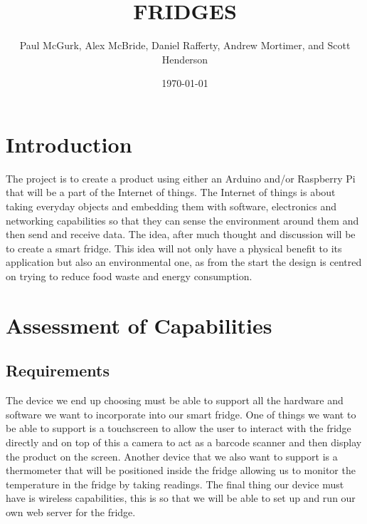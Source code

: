 \documentclass[10pt]{article}
\title{FRIDGES}
\author{Paul McGurk, Alex McBride, Daniel Rafferty, Andrew Mortimer, and Scott Henderson}
\date{\today}
\begin{document}
\begin{titlepage}
\maketitle
\end{titlepage}

\linespread{1.15} %
\renewcommand{\arraystretch}{1.2} %

\tableofcontents

\newpage
\section{Introduction}

The project is to create a product using either an Arduino and/or Raspberry Pi that will be a part of the Internet of things. The Internet of things is about taking everyday objects and embedding them with software, electronics and networking capabilities so that they can sense the environment around them and then send and receive data. The idea, after much thought and discussion will be to create a smart fridge. This idea will not only have a physical benefit to its application but also an environmental one, as from the start the design is centred on trying to reduce food waste and energy consumption.

\newpage
\section{Assessment of Capabilities}

\subsection{Requirements}

The device we end up choosing must be able to support all the hardware and software we want to incorporate into our smart fridge. One of things we want to be able to support is a touchscreen to allow the user to interact with the fridge directly and on top of this a camera to act as a barcode scanner and then display the product on the screen. Another device that we also want to support is a thermometer that will be positioned inside the fridge allowing us to monitor the temperature in the fridge by taking readings. The final thing our device must have is wireless capabilities, this is so that we will be able to set up and run our own web server for the fridge.
\end{document}
